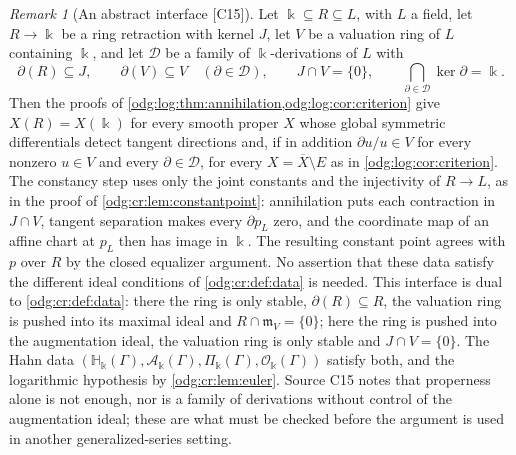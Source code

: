 \documentclass[11pt,oneside]{article}
\numberwithin{equation}{section}
\theoremstyle{definition}
\theoremstyle{remark}
\newtheorem{remark}[remark]{Remark}
\newcommand{\src}[1]{\textup{\textsf{\small[#1]}}}
\newcommand{\crH}{\mathbb H_\Bbbk(\Gamma)}
\newcommand{\crA}{\mathcal A_\Bbbk(\Gamma)}
\newcommand{\crP}{\Pi_\Bbbk(\Gamma)}
\newcommand{\crO}{\mathcal O_\Bbbk(\Gamma)}
\begin{document}
\begin{remark}[An abstract interface \src{C15}]\label{odg:log:rem:interface}
Let $\Bbbk\subseteq R\subseteq L$, with $L$ a field, let $R\to\Bbbk$ be a ring retraction
with kernel $J$, let $V$ be a valuation ring of $L$ containing $\Bbbk$, and let
$\mathcal D$ be a family of $\Bbbk$-derivations of $L$ with
\[
 \partial(R)\subseteq J,\qquad \partial(V)\subseteq V\quad(\partial\in\mathcal D),\qquad
 J\cap V=\{0\},\qquad \bigcap_{\partial\in\mathcal D}\ker\partial=\Bbbk .
\]
Then the proofs of \cref{odg:log:thm:annihilation,odg:log:cor:criterion} give
$X(R)=X(\Bbbk)$ for every smooth proper $X$ whose global symmetric differentials detect
tangent directions and, if in addition $\partial u/u\in V$ for every nonzero $u\in V$ and
every $\partial\in\mathcal D$, for every $X=\overline X\setminus E$ as in
\cref{odg:log:cor:criterion}. The constancy step uses only the joint constants and the
injectivity of $R\to L$, as in the proof of \cref{odg:cr:lem:constantpoint}:
annihilation puts each contraction in $J\cap V$, tangent separation makes
every $\partial p_L$ zero, and the coordinate map of an affine chart at
$p_L$ then has image in $\Bbbk$. The resulting constant point agrees
with $p$ over $R$ by the closed equalizer argument. No assertion that
these data satisfy the different ideal conditions of
\cref{odg:cr:def:data} is needed. This
interface is dual to \cref{odg:cr:def:data}: there the ring is only stable,
$\partial(R)\subseteq R$, the valuation ring is pushed into its maximal ideal and
$R\cap\mathfrak m_V=\{0\}$; here the ring is pushed into the augmentation ideal, the
valuation ring is only stable and $J\cap V=\{0\}$. The Hahn data $(\crH,\crA,\crP,\crO)$
satisfy both, and the logarithmic hypothesis by \cref{odg:cr:lem:euler}. Source C15 notes
that properness alone is not enough, nor is a family of derivations without control of
the augmentation ideal; these are what must be checked before the argument is used in
another generalized-series setting.
\end{remark}
\end{document}
